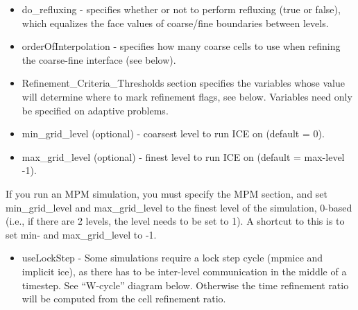 \begin{itemize}
\item do\_refluxing - specifies whether or not to perform refluxing (true or false),
  which equalizes the face values of coarse/fine boundaries between
  levels.
\item orderOfInterpolation - specifies how many coarse cells to use
  when refining the coarse-fine interface (see below).
\item Refinement\_Criteria\_Thresholds section specifies the
  variables whose value will determine where to mark refinement flags,
  see below. Variables need only be specified on adaptive problems.
\item min\_grid\_level (optional) - coarsest level to run ICE on
  (default = 0).
\item max\_grid\_level (optional) - finest level to run ICE on (default
  = max-level -1).

\end{itemize}

If you run an MPM simulation, you must specify the MPM section, and
set min\_grid\_level and max\_grid\_level to the finest level of the
simulation, 0-based (i.e., if there are 2 levels, the level needs to
be set to 1). A shortcut to this is to set min- and max\_grid\_level to
-1.

\begin{itemize}
\item useLockStep - Some simulations require a lock step cycle (mpmice
  and implicit ice), as there has to be inter-level communication in
  the middle of a timestep. See ``W-cycle'' diagram below. Otherwise the
  time refinement ratio will be computed from the cell refinement
  ratio.
\end{itemize}


